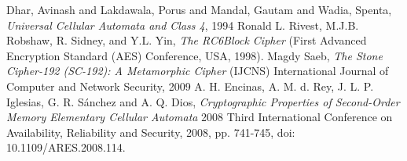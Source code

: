 \documentclass{article}
\begin{document}
\begin{thebibliography}{unsrt}
  Dhar, Avinash and Lakdawala, Porus and Mandal, Gautam and Wadia, Spenta, \emph{Universal Cellular Automata and Class 4}, 1994
  Ronald L. Rivest, M.J.B. Robshaw, R. Sidney, and Y.L. Yin, \emph{The RC6\texttrademark Block Cipher} (First Advanced Encryption Standard (AES) Conference, USA, 1998).
  Magdy Saeb, \emph{The Stone Cipher-192 (SC-192): A Metamorphic Cipher} (IJCNS) International Journal of Computer and Network Security, 2009
  A. H. Encinas, A. M. d. Rey, J. L. P. Iglesias, G. R. Sánchez and A. Q. Dios, \emph{Cryptographic Properties of Second-Order Memory Elementary Cellular Automata} 2008 Third International Conference on Availability, Reliability and Security, 2008, pp. 741-745, doi: 10.1109/ARES.2008.114.
\end{thebibliography}
\end{document}
